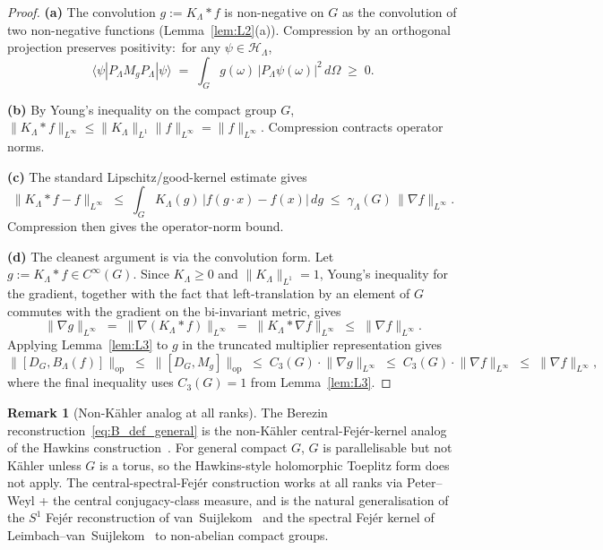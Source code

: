 \documentclass[11pt,a4paper]{article}
\theoremstyle{plain}
\theoremstyle{definition}
\newtheorem{remark}[theorem]{Remark}
\newcommand{\Lammax}{\Lambda}
\newcommand{\Hilb}{\mathcal{H}}
\newcommand{\opnorm}[1]{\lVert #1 \rVert_{\mathrm{op}}}
\newcommand{\norm}[1]{\lVert #1 \rVert}
\newcommand{\Dop}{D}
\newcommand{\KS}{K}
\begin{document}
\begin{proof}
\textbf{(a)} The convolution $g := \KS_\Lammax * f$ is non-negative on
$G$ as the convolution of two non-negative functions
(Lemma~\ref{lem:L2}(a)). Compression by an orthogonal projection
preserves positivity:\ for any $\psi \in \Hilb_\Lammax$,
\begin{equation*}
   \langle \psi | P_\Lammax M_g P_\Lammax | \psi \rangle
   \;=\; \int_G g(\omega)\,|P_\Lammax \psi(\omega)|^2\, d\Omega
   \;\ge\; 0.
\end{equation*}

\textbf{(b)} By Young's inequality on the compact group $G$,
$\lVert \KS_\Lammax * f \rVert_{L^\infty} \le \norm{\KS_\Lammax}_{L^1}
\norm{f}_{L^\infty} = \norm{f}_{L^\infty}$. Compression contracts
operator norms.

\textbf{(c)} The standard Lipschitz/good-kernel estimate gives
\begin{equation*}
   \norm{\KS_\Lammax * f - f}_{L^\infty}
   \;\le\; \int_G \KS_\Lammax(g)\,|f(g \cdot x) - f(x)|\, dg
   \;\le\; \gamma_\Lammax(G)\,\norm{\nabla f}_{L^\infty}.
\end{equation*}
Compression then gives the operator-norm bound.

\textbf{(d)} The cleanest argument is via the convolution form. Let
$g := \KS_\Lammax * f \in C^\infty(G)$. Since $\KS_\Lammax \ge 0$ and
$\norm{\KS_\Lammax}_{L^1} = 1$, Young's inequality for the gradient,
together with the fact that left-translation by an element of $G$
commutes with the gradient on the bi-invariant metric, gives
\begin{equation}\label{eq:young_gradient_general}
   \norm{\nabla g}_{L^\infty}
   \;=\; \norm{\nabla(\KS_\Lammax * f)}_{L^\infty}
   \;=\; \norm{\KS_\Lammax * \nabla f}_{L^\infty}
   \;\le\; \norm{\nabla f}_{L^\infty}.
\end{equation}
Applying Lemma~\ref{lem:L3} to $g$ in the truncated multiplier
representation gives
\begin{equation*}
   \opnorm{[\Dop_G, B_\Lammax(f)]}
   \;\le\; \opnorm{[\Dop_G, M_g]}
   \;\le\; C_3(G) \cdot \norm{\nabla g}_{L^\infty}
   \;\le\; C_3(G) \cdot \norm{\nabla f}_{L^\infty}
   \;\le\; \norm{\nabla f}_{L^\infty},
\end{equation*}
where the final inequality uses $C_3(G) = 1$ from
Lemma~\ref{lem:L3}.
\end{proof}

\begin{remark}[Non-K\"ahler analog at all ranks]\label{rem:L4_nonkahler}
The Berezin reconstruction~\eqref{eq:B_def_general} is the
non-K\"ahler central-Fej\'er-kernel analog of the Hawkins
construction~\cite{hawkins2000}. For general compact $G$, $G$ is
parallelisable but not K\"ahler unless $G$ is a torus, so the
Hawkins-style holomorphic Toeplitz form does not apply. The
central-spectral-Fej\'er construction works at all ranks via
Peter--Weyl + the central conjugacy-class measure, and is the natural
generalisation of the $S^1$ Fej\'er
reconstruction of van~Suijlekom~\cite{vs2021_jgp} and the spectral Fej\'er
kernel of Leimbach--van~Suijlekom~\cite{leimbach_vs2024} to non-abelian
compact groups.
\end{remark}
\end{document}
